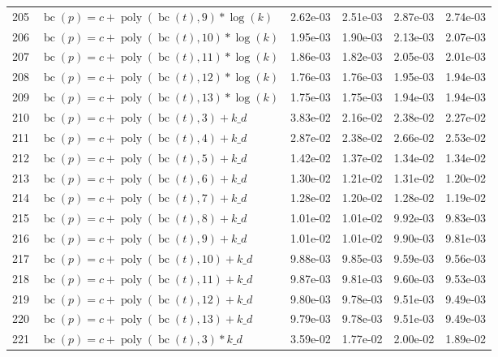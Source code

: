 \documentclass[12pt,a4paper]{article}
\DeclareMathOperator{\bc}{bc}
\DeclareMathOperator{\poly}{poly}
\begin{document}
\begin{longtable}[t]{ll>{\raggedleft\arraybackslash}p{2cm}>{\raggedleft\arraybackslash}p{2cm}>{\raggedleft\arraybackslash}p{2cm}>{\raggedleft\arraybackslash}p{2cm}}
\rowcolor{gray!6}  205 & $\bc(p) = c + \poly\left( \bc(t), 9 \right) * \log(k)$ & 2.62e-03 & 2.51e-03 & 2.87e-03 & 2.74e-03\\
206 & $\bc(p) = c + \poly\left( \bc(t), 10 \right) * \log(k)$ & 1.95e-03 & 1.90e-03 & 2.13e-03 & 2.07e-03\\
\rowcolor{gray!6}  207 & $\bc(p) = c + \poly\left( \bc(t), 11 \right) * \log(k)$ & 1.86e-03 & 1.82e-03 & 2.05e-03 & 2.01e-03\\
208 & $\bc(p) = c + \poly\left( \bc(t), 12 \right) * \log(k)$ & 1.76e-03 & 1.76e-03 & 1.95e-03 & 1.94e-03\\
\rowcolor{gray!6}  209 & $\bc(p) = c + \poly\left( \bc(t), 13 \right) * \log(k)$ & 1.75e-03 & 1.75e-03 & 1.94e-03 & 1.94e-03\\
210 & $\bc(p) = c + \poly\left( \bc(t), 3 \right) + k\_d$ & 3.83e-02 & 2.16e-02 & 2.38e-02 & 2.27e-02\\
\rowcolor{gray!6}  211 & $\bc(p) = c + \poly\left( \bc(t), 4 \right) + k\_d$ & 2.87e-02 & 2.38e-02 & 2.66e-02 & 2.53e-02\\
212 & $\bc(p) = c + \poly\left( \bc(t), 5 \right) + k\_d$ & 1.42e-02 & 1.37e-02 & 1.34e-02 & 1.34e-02\\
\rowcolor{gray!6}  213 & $\bc(p) = c + \poly\left( \bc(t), 6 \right) + k\_d$ & 1.30e-02 & 1.21e-02 & 1.31e-02 & 1.20e-02\\
214 & $\bc(p) = c + \poly\left( \bc(t), 7 \right) + k\_d$ & 1.28e-02 & 1.20e-02 & 1.28e-02 & 1.19e-02\\
\rowcolor{gray!6}  215 & $\bc(p) = c + \poly\left( \bc(t), 8 \right) + k\_d$ & 1.01e-02 & 1.01e-02 & 9.92e-03 & 9.83e-03\\
216 & $\bc(p) = c + \poly\left( \bc(t), 9 \right) + k\_d$ & 1.01e-02 & 1.01e-02 & 9.90e-03 & 9.81e-03\\
\rowcolor{gray!6}  217 & $\bc(p) = c + \poly\left( \bc(t), 10 \right) + k\_d$ & 9.88e-03 & 9.85e-03 & 9.59e-03 & 9.56e-03\\
218 & $\bc(p) = c + \poly\left( \bc(t), 11 \right) + k\_d$ & 9.87e-03 & 9.81e-03 & 9.60e-03 & 9.53e-03\\
\rowcolor{gray!6}  219 & $\bc(p) = c + \poly\left( \bc(t), 12 \right) + k\_d$ & 9.80e-03 & 9.78e-03 & 9.51e-03 & 9.49e-03\\
220 & $\bc(p) = c + \poly\left( \bc(t), 13 \right) + k\_d$ & 9.79e-03 & 9.78e-03 & 9.51e-03 & 9.49e-03\\
\rowcolor{gray!6}  221 & $\bc(p) = c + \poly\left( \bc(t), 3 \right) * k\_d$ & 3.59e-02 & 1.77e-02 & 2.00e-02 & 1.89e-02\\

\end{longtable}
\end{document}
